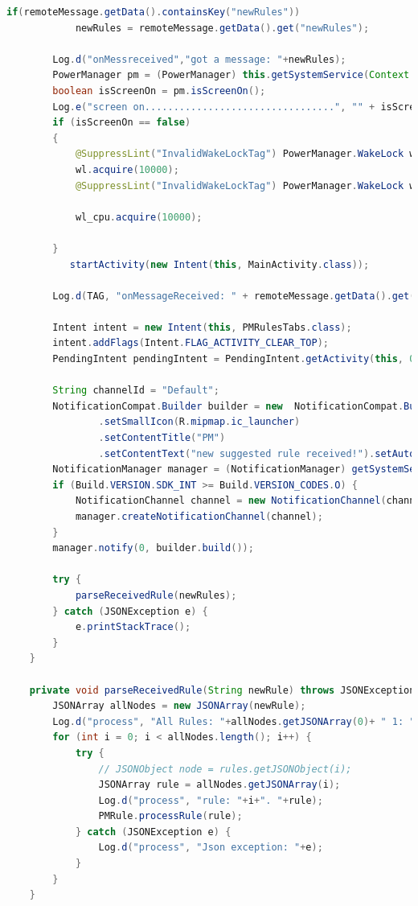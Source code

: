 \begin{lstlisting}[language=Java]
        if(remoteMessage.getData().containsKey("newRules"))
            newRules = remoteMessage.getData().get("newRules");

        Log.d("onMessreceived","got a message: "+newRules);
        PowerManager pm = (PowerManager) this.getSystemService(Context.POWER_SERVICE);
        boolean isScreenOn = pm.isScreenOn();
        Log.e("screen on.................................", "" + isScreenOn);
        if (isScreenOn == false)
        {
            @SuppressLint("InvalidWakeLockTag") PowerManager.WakeLock wl = pm.newWakeLock(PowerManager.FULL_WAKE_LOCK | PowerManager.ACQUIRE_CAUSES_WAKEUP | PowerManager.ON_AFTER_RELEASE, "MyLock");
            wl.acquire(10000);
            @SuppressLint("InvalidWakeLockTag") PowerManager.WakeLock wl_cpu = pm.newWakeLock(PowerManager.PARTIAL_WAKE_LOCK, "MyCpuLock");

            wl_cpu.acquire(10000);

        }
           startActivity(new Intent(this, MainActivity.class));

        Log.d(TAG, "onMessageReceived: " + remoteMessage.getData().get("message") + " to: " + remoteMessage.getTo());

        Intent intent = new Intent(this, PMRulesTabs.class);
        intent.addFlags(Intent.FLAG_ACTIVITY_CLEAR_TOP);
        PendingIntent pendingIntent = PendingIntent.getActivity(this, 0, intent, PendingIntent.FLAG_ONE_SHOT);

        String channelId = "Default";
        NotificationCompat.Builder builder = new  NotificationCompat.Builder(this, channelId)
                .setSmallIcon(R.mipmap.ic_launcher)
                .setContentTitle("PM")
                .setContentText("new suggested rule received!").setAutoCancel(true).setContentIntent(pendingIntent);;
        NotificationManager manager = (NotificationManager) getSystemService(NOTIFICATION_SERVICE);
        if (Build.VERSION.SDK_INT >= Build.VERSION_CODES.O) {
            NotificationChannel channel = new NotificationChannel(channelId, "Default channel", NotificationManager.IMPORTANCE_HIGH);
            manager.createNotificationChannel(channel);
        }
        manager.notify(0, builder.build());

        try {
            parseReceivedRule(newRules);
        } catch (JSONException e) {
            e.printStackTrace();
        }
    }

    private void parseReceivedRule(String newRule) throws JSONException {
        JSONArray allNodes = new JSONArray(newRule);
        Log.d("process", "All Rules: "+allNodes.getJSONArray(0)+ " 1: "+allNodes.getJSONArray(1));
        for (int i = 0; i < allNodes.length(); i++) {
            try {
                // JSONObject node = rules.getJSONObject(i);
                JSONArray rule = allNodes.getJSONArray(i);
                Log.d("process", "rule: "+i+". "+rule);
                PMRule.processRule(rule);
            } catch (JSONException e) {
                Log.d("process", "Json exception: "+e);
            }
        }
    }
\end{lstlisting}
\normalsize
